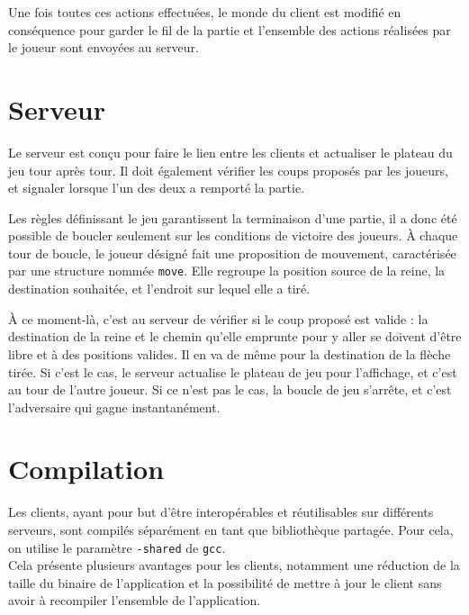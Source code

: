 \medbreak
Une fois toutes ces actions effectuées, le monde du client est modifié en conséquence pour garder le fil de la partie et l'ensemble des actions réalisées par le joueur sont envoyées au serveur.

\section{Serveur}
\label{sec:serveur}

Le serveur est conçu pour faire le lien entre les clients et actualiser le plateau du jeu tour après tour. Il doit également vérifier les coups proposés par les joueurs, et signaler lorsque l'un des deux a remporté la partie.

\medbreak

Les règles définissant le jeu garantissent la terminaison d'une partie, il a donc été possible de boucler seulement sur les conditions de victoire des joueurs. À chaque tour de boucle, le joueur désigné fait une proposition de mouvement, caractérisée par une structure nommée \texttt{move}. Elle regroupe la position source de la reine, la destination souhaitée, et l'endroit sur lequel elle a tiré.

\medbreak

À ce moment-là, c'est au serveur de vérifier si le coup proposé est valide : la destination de la reine et le chemin qu'elle emprunte pour y aller se doivent d'être libre et à des positions valides. Il en va de même pour la destination de la flèche tirée. Si c'est le cas, le serveur actualise le plateau de jeu pour l'affichage, et c'est au tour de l'autre joueur. Si ce n'est pas le cas, la boucle de jeu s'arrête, et c'est l'adversaire qui gagne instantanément.

\section{Compilation}
\label{sec:compil}

Les clients, ayant pour but d'être interopérables et réutilisables sur différents serveurs, sont compilés séparément en tant que bibliothèque partagée. Pour cela, on utilise le paramètre \texttt{-shared} de \texttt{gcc}.\\
Cela présente plusieurs avantages pour les clients, notamment une réduction de la taille du binaire de l'application et la possibilité de mettre à jour le client sans avoir à recompiler l'ensemble de l'application.

\medbreak

